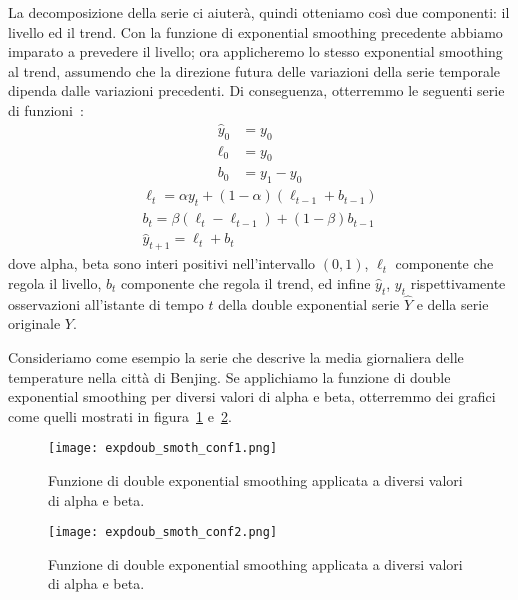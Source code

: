 La decomposizione della serie ci aiuterà, quindi otteniamo così due componenti: il livello
ed il trend. Con la funzione di exponential smoothing precedente abbiamo imparato a 
prevedere il livello; ora applicheremo lo stesso exponential smoothing al trend, assumendo
che la direzione futura delle variazioni della serie temporale dipenda dalle variazioni precedenti.
Di conseguenza, otterremmo le seguenti serie di funzioni~\cite{mlc:tim_ser_an}:
\begin{align*}
    \hat{y}_0 & = y_0 \\
    \ell_0 & = y_0 \quad \\
    b_0    & = y_1 - y_0
\end{align*}
\begin{gather*}
    \ell_t = \alpha y_t + (1 - \alpha) (\ell_{t-1} + b_{t-1})\\
    b_t    = \beta(\ell_t - \ell_{t-1}) + (1 - \beta)b_{t-1} \\
    \hat{y}_{t+1} = \ell_t + b_t
\end{gather*}
dove alpha, beta sono interi positivi nell'intervallo $(0, 1)$, 
$\ell_t$ componente che regola il livello,
$b_t$ componente che regola il trend, ed infine
$\hat{y}_t$, $y_t$ rispettivamente osservazioni all'istante di tempo $t$ della double
exponential serie $\hat{Y}$ e della serie originale $Y$.

\begin{esempio}
    Consideriamo come esempio la serie che descrive la media giornaliera delle temperature
    nella città di Benjing. Se applichiamo la funzione di double exponential smoothing per diversi
    valori di alpha e beta, otterremmo dei grafici come quelli mostrati 
    in figura~\ref*{fig:expdoub_smoot1} e~\ref*{fig:expdoub_smoot2}.
    
    \begin{figure}[H]
        \centering
        \texttt{[image: expdoub\_smoth\_conf1.png]}
        \caption{Funzione di double exponential smoothing applicata a diversi valori di alpha e beta.}
        \label{fig:expdoub_smoot1}
    \end{figure}

    \begin{figure}[H]
        \centering
        \texttt{[image: expdoub\_smoth\_conf2.png]}
        \caption{Funzione di double exponential smoothing applicata a diversi valori di alpha e beta.}
        \label{fig:expdoub_smoot2}
    \end{figure}

\end{esempio}